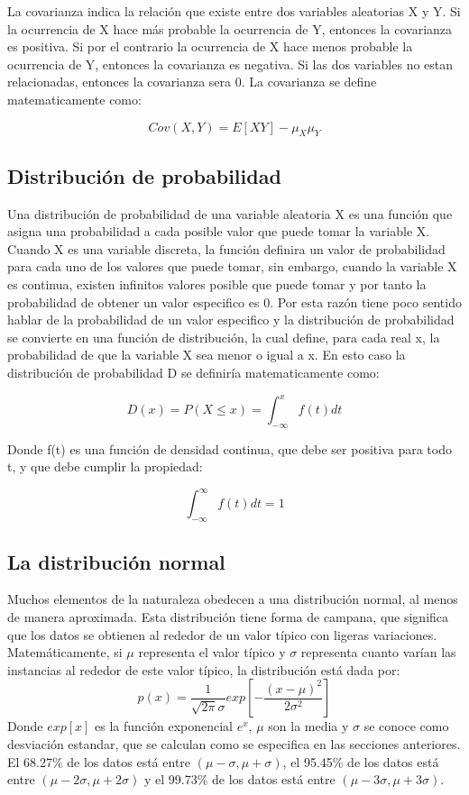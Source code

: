 \documentclass[a4paper, 11pt, oneside]{report}
\begin{document}
La covarianza indica la relación que existe entre dos variables aleatorias X y Y. Si la ocurrencia de X hace más probable la ocurrencia de Y, entonces la covarianza es positiva. Si por el contrario la ocurrencia de X hace menos probable la ocurrencia de Y, entonces la covarianza es negativa. Si las dos variables no estan relacionadas, entonces la covarianza sera 0. La covarianza se define matematicamente como:

	\[Cov(X, Y) = E[XY] - \mu_X\mu_Y\]


\subsection{Distribución de probabilidad}

Una distribución de probabilidad de una variable aleatoria X es una función que asigna una probabilidad a cada posible valor que puede tomar la variable X. Cuando X es una variable discreta, la función definira un valor de probabilidad para cada uno de los valores que puede tomar, sin embargo, cuando la variable X es continua, existen infinitos valores posible que puede tomar y por tanto la probabilidad de obtener un valor especifico es 0. Por esta razón tiene poco sentido hablar de la probabilidad de un valor especifico y la distribución de probabilidad se convierte en una función de distribución, la cual define, para cada real x, la probabilidad de que la variable X sea menor o igual a x. En esto caso la distribución de probabilidad D se definiría matematicamente como:

	\[D(x) = P(X \leq x) = \int_{-\infty}^x{f(t)dt}\]

Donde f(t) es una función de densidad continua, que debe ser positiva para todo t, y que debe cumplir la propiedad:

	\[\int_{-\infty}^{\infty}{f(t)dt} = 1\]
	
\subsection{La distribución normal}

Muchos elementos de la naturaleza obedecen a una distribución normal, al menos de manera aproximada. Esta distribución tiene forma de campana, que significa que los datos se obtienen al rededor de un valor típico con ligeras variaciones. Matemáticamente, si $\mu$ representa el valor típico y $\sigma$ representa cuanto varían las instancias al rededor de este valor típico, la distribución está dada por:
\begin{equation}
	p(x) = \frac{1}{\sqrt{2\pi}\sigma}exp\left[-\frac{(x-\mu)^2}{2\sigma^2}\right]
	\label{eq:normal}
\end{equation}
Donde $exp[x]$ es la función exponencial $e^x$, $\mu$ son la media y $\sigma$ se conoce como desviación estandar, que se calculan como se especifica en las secciones anteriores. El 68.27\% de los datos está entre $(\mu-\sigma, \mu+\sigma)$, el 95.45\% de los datos está entre $(\mu-2\sigma, \mu+2\sigma)$ y el 99.73\% de los datos está entre $(\mu-3\sigma, \mu+3\sigma)$.
\end{document}
